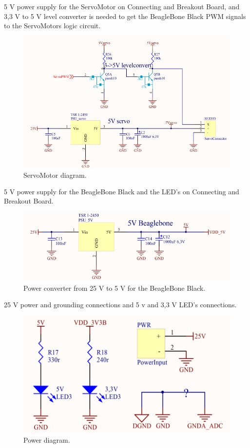 5 V power supply for the ServoMotor on Connecting and Breakout Board, and 3,3 V to 5 V level converter is needed to get the BeagleBone Black PWM signals to the ServoMotors logic circuit. 
\begin{figure}[H]
	\centering
	\includegraphics[scale=0.92]{figures/ServoMotor.pdf}
	\caption{ServoMotor diagram.}
	\label{labServoMotor}
\end{figure}\vspace{-5mm}

5 V power supply for the BeagleBone Black and the LED’s on Connecting and Breakout Board.
\begin{figure}[H]
	\centering
	\includegraphics[scale=0.92]{figures/BeagleBone.pdf}
	\caption{Power converter from 25 V to 5 V for the BeagleBone Black.}
	\label{labBeagleBone}
\end{figure}\vspace{-5mm}

25 V power and grounding connections and 5 v and 3,3 V LED's connections.
\begin{figure}[H]
	\centering
	\includegraphics[scale=0.92]{figures/Power.pdf}
	\caption{Power diagram.}
	\label{labPower}
\end{figure}\vspace{-5mm}

